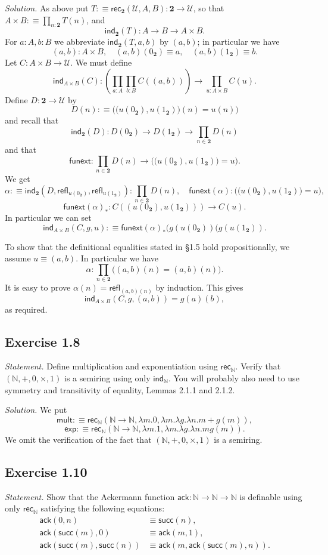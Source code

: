\documentclass[12pt]{article}
\newcommand{\msf}{\mathsf}
\newcommand{\ack}{\mathsf{ack}}
\newcommand{\fu}{\mathsf{funext}}
\newcommand{\ind}{\mathsf{ind}}
\newcommand{\la}{\lambda}
\newcommand{\N}{\mathbb N}
\newcommand{\nn}{\noindent}
\newcommand{\rec}{\mathsf{rec}}
\newcommand{\refl}{\mathsf{refl}}
\newcommand{\su}{\mathsf{succ}}
\newcommand{\two}{\mathbf2}
\newcommand{\U}{\mathcal U}
\begin{document}
\nn\emph{Solution.} As above put $T:\equiv\rec_\two(\U,A,B):\two\to\U$, so that $A\times B:\equiv\prod_{n:\two}T(n)$, and 
$$
\ind_\two(T):A\to B\to A\times B.
$$ 
For $a:A,b:B$ we abbreviate $\ind_\two(T,a,b)$ by $(a,b)$; in particular we have 
$$
(a,b):A\times B,\quad(a,b)(0_\two)\equiv a,\quad(a,b)(1_\two)\equiv b.
$$ 
Let $C:A\times B\to\U$. We must define 
$$
\ind_{A\times B}(C):\left(\prod_{a:A}\prod_{b:B}C((a,b))\right)\to\prod_{u:A\times B}C(u).
$$ 
Define $D:\two\to\U$ by 
$$
D(n):\equiv\Big(\big(u(0_\two),u(1_\two)\big)(n)=u(n)\Big)
$$ 
and recall that 
$$
\ind_\two(D):D(0_\two)\to D(1_\two)\to\prod_{n\in\two}D(n)
$$ 
and that 
$$
\fu:\prod_{n\in\two}D(n)\to\Big(\big(u(0_\two),u(1_\two)\big)=u\Big).
$$
We get 
$$
\alpha:\equiv\ind_\two(D,\refl_{u(0_\two)},\refl_{u(1_\two)}):\prod_{n\in\two}D(n),\quad\fu(\alpha):\Big(\big(u(0_\two),u(1_\two)\big)=u\Big),
$$
$$
\fu(\alpha)_*:C((u(0_\two),u(1_\two)))\to C(u).
$$
In particular we can set
$$
\ind_{A\times B}(C,g,u):\equiv\fu(\alpha)_*(g(u(0_\two))(g(u(1_\two)).
$$

To show that the definitional equalities stated in \S1.5 hold propositionally, we assume $u\equiv(a,b)$. In particular we have 
$$
\alpha:\prod_{n\in\two}\Big((a,b)(n)=(a,b)(n)\Big).
$$ 
It is easy to prove $\alpha(n)=\refl_{(a,b)(n)}$ by induction. This gives 
$$
\ind_{A\times B}(C,g,(a,b))=g(a)(b),
$$ 
as required.


\subsection{Exercise 1.8}

\emph{Statement.} Define multiplication and exponentiation using $\rec_\N$. Verify that $(\N,+,0,\times,1)$ is a semiring using only $\ind_\N$. You will probably also need to use symmetry and transitivity of equality, Lemmas 2.1.1 and 2.1.2.

\nn\emph{Solution.} We put
$$
\msf{mult}:\equiv\rec_\N(\N\to\N,\la m.0,\la m.\la g.\la n.m+g(m)),
$$
$$
\msf{exp}:\equiv\rec_\N(\N\to\N,\la m.1,\la m.\la g.\la n.mg(m)).
$$ 
We omit the verification of the fact that $(\N,+,0,\times,1)$ is a semiring.


\subsection{Exercise 1.10}

\emph{Statement.} Show that the Ackermann function $\ack :\N\to\N\to\N$ is definable using only $\rec_\N$ satisfying the following equations:
\begin{align*}
\ack(0,n)&\equiv\su(n),\\
\ack(\su(m),0)&\equiv\ack(m,1),\\
\ack(\su(m),\su(n))&\equiv\ack(m,\ack(\su(m),n)).
\end{align*}
\end{document}
